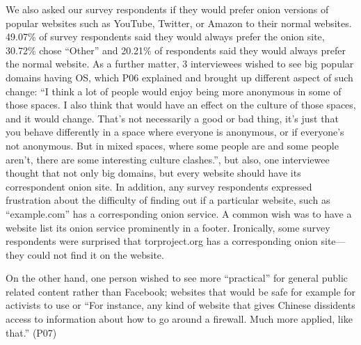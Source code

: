 We also asked our survey respondents if they would prefer onion versions of
popular websites such as YouTube, Twitter, or Amazon to their normal websites.
49.07\% of survey respondents said they would always prefer the onion site,
30.72\% chose ``Other'' and 20.21\% of respondents said they would always prefer
the normal website. As a further matter, 3 interviewees wished to see big
popular domains having OS, which P06 explained and brought up different aspect
of such change: ``I think a lot of people would enjoy being more anonymous in
some of those spaces. I also think that would have an effect on the culture of
those spaces, and it would change. That's not necessarily a good or bad thing,
it's just that you behave differently in a space where everyone is anonymous, or
if everyone's not anonymous. But in mixed spaces, where some people are and some
people aren't, there are some interesting culture clashes.'', but also, one
interviewee thought that not only big domains, but every website should have its
correspondent onion site. In addition, any survey respondents expressed
frustration about the difficulty of finding out if a particular website, such as
``example.com'' has a corresponding onion service.  A common wish was to have a
website list its onion service prominently in a footer.  Ironically, some survey
respondents were surprised that torproject.org has a corresponding onion
site---they could not find it on the website.

 On the other hand, one person wished to see more ``practical'' for general
 public related content rather than Facebook; websites that would be safe for
 example for activists to use or ``For instance, any kind of website that gives
 Chinese dissidents access to information about how to go around a firewall.
 Much more applied, like that.'' (P07)

